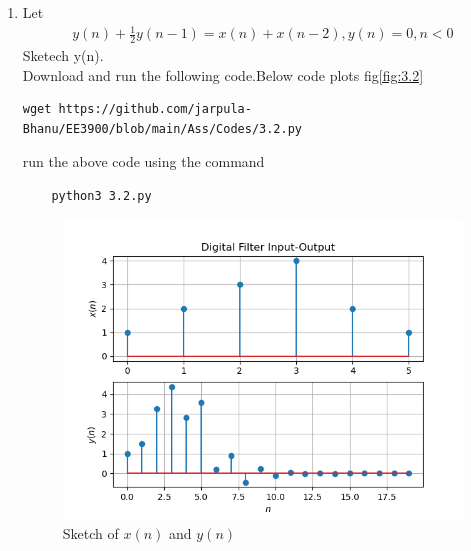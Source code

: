 \documentclass[journal,12pt,twocolumn]{IEEEtran}
\renewcommand\thesection{\arabic{section}}
\begin{document}
\begin{enumerate}[label=\thesection.\arabic*
,ref=\thesection.\theenumi]
\item Let
	\begin{align}\label{3.2}
		y(n) + \frac{1}{2}y(n-1) = x(n)+x(n-2),
		y(n)=0,n<0
	\end{align}
Sketech y(n).\\
\solution Download and run the following code.Below code plots fig\eqref{fig:3.2}
\begin{lstlisting}
wget https://github.com/jarpula-Bhanu/EE3900/blob/main/Ass/Codes/3.2.py
\end{lstlisting}
run the above code using the command
\begin{lstlisting}
	python3 3.2.py
\end{lstlisting}
\begin{figure}[h]
    \centering
    \includegraphics[width=\columnwidth]{./figs/3.2.png}
    \caption{Sketch of $x(n)$ and $y(n)$}
    \label{fig:3.2}
\end{figure}


\end{enumerate}
\end{document}
